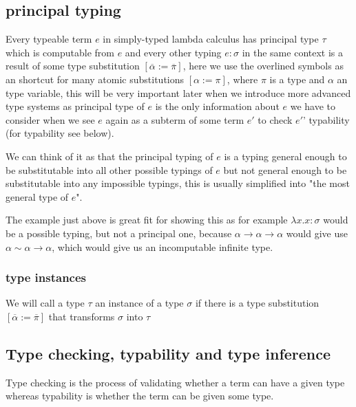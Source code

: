 \subsection{principal typing}

Every typeable term $e$ in simply-typed lambda calculus has principal type $\tau$ which is computable from $e$ and every other typing
$e : \sigma$ in the same context is a result of some type substitution $[\overline{\alpha} := \overline{\pi}]$, here we use the overlined symbols
as an shortcut for many atomic substitutions $[\alpha := \pi]$, where $\pi$ is a type and $\alpha$ an type variable, this will be very important
later when we introduce more advanced type systems as principal type of $e$ is the only information about $e$ we have to consider
when we see $e$ again as a subterm of some term $e'$ to check $e'$' typability (for typability see below). %

We can think of it as that the principal typing of $e$ is a typing general enough to be substitutable into all other possible typings of $e$
but not general enough to be substitutable into any impossible typings, this is usually simplified into "the most general type of $e$". %

The example just above %
is great fit for showing this as for example $\lambda x . x : \sigma$ would be a possible typing, but not a principal one, because
$\alpha \rightarrow \alpha \rightarrow \alpha$ would give use $\alpha \sim \alpha \rightarrow \alpha$, which would give us an incomputable
infinite type.

\subsubsection{type instances}

We will call a type $\tau$ an instance of a type $\sigma$ if there is a type substitution $[\overline{\alpha} := \overline{\pi}]$
that transforms $\sigma$ into $\tau$ %

\subsection{Type checking, typability and type inference}

Type checking is the process of validating whether a term can have a given type
whereas typability is whether the term can be given some type.

